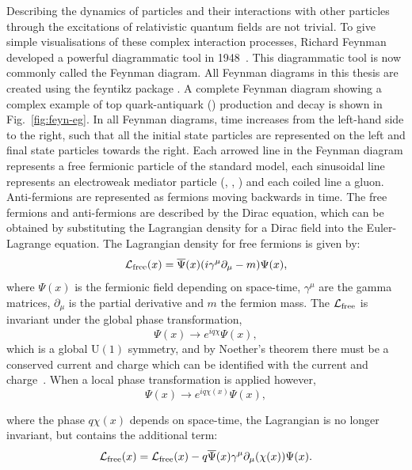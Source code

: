 Describing the dynamics of particles and their interactions with other particles through the excitations of relativistic quantum fields are not trivial.
To give simple visualisations of these complex interaction processes, Richard Feynman developed a powerful diagrammatic tool in 1948~\cite{Th:Feynman1, Th:Feynman2}.
This diagrammatic tool is now commonly called the Feynman diagram.
All Feynman diagrams in this thesis are created using the feyntikz package \cite{feyntikz}.
A complete Feynman diagram showing a complex example of top quark-antiquark (\ttbar{}) production and decay is shown in Fig.~\ref{fig:feyn-eg}.
In all Feynman diagrams, time increases from the left-hand side to the right, such that all the initial state particles are represented on the left and final state particles towards the right.
Each arrowed line in the Feynman diagram represents a free fermionic particle of the standard model, each sinusoidal line represents an electroweak mediator particle (\Wboson{}, \Zboson{}, \photon{}) and each coiled line a gluon.
Anti-fermions are represented as fermions moving backwards in time.
The free fermions and anti-fermions are described by the Dirac equation, which can be obtained by substituting the Lagrangian density for a Dirac field into the Euler-Lagrange equation. 
The Lagrangian density for free fermions is given by:
\begin{equation}
\mathcal{L}_{\text{free}}(x) = \overline{\Psi}(x)(i\gamma^{\mu}\partial_{\mu}-m)\Psi(x),
\end{equation}
where $\Psi(x)$ is the fermionic field depending on space-time, $\gamma^{\mu}$ are the gamma matrices, $\partial_{\mu}$ is the partial derivative and $m$ the fermion mass.
The $\mathcal{L}_{\text{free}}$ is invariant under the global phase transformation,
\begin{equation}
\Psi(x) \to e^{iq\chi}\Psi(x),
\end{equation}
which is a global $\mathrm{U(1)}$ symmetry, and by Noether's theorem there must be a conserved current and charge which can be identified with the \EM{} current and charge~\cite{Th:Noether}.
When a local phase transformation is applied however,
\begin{equation}
\Psi(x) \to e^{iq\chi(x)}\Psi(x),
\end{equation}

where the phase $q\chi(x)$ depends on space-time, the Lagrangian is no longer invariant, but contains the additional term:
\begin{equation}
\mathcal{L}_{\text{free}}(x) = \mathcal{L}_{\text{free}}(x)-q\overline{\Psi}(x)\gamma^{\mu}\partial_{\mu}(\chi(x))\Psi(x).
\end{equation}
